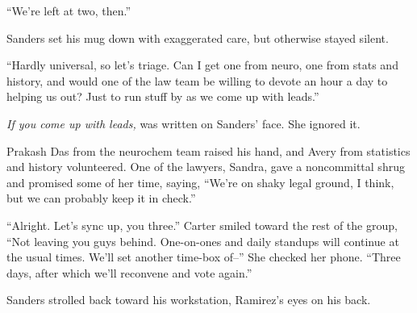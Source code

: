 ``We're left at two, then.''

Sanders set his mug down with exaggerated care, but otherwise stayed silent.

``Hardly universal, so let's triage. Can I get one from neuro, one from stats and history, and would one of the law team be willing to devote an hour a day to helping us out? Just to run stuff by as we come up with leads.''

\emph{If you come up with leads,} was written on Sanders' face. She ignored it.

Prakash Das from the neurochem team raised his hand, and Avery from statistics and history volunteered. One of the lawyers, Sandra, gave a noncommittal shrug and promised some of her time, saying, ``We're on shaky legal ground, I think, but we can probably keep it in check.''

``Alright. Let's sync up, you three.'' Carter smiled toward the rest of the group, ``Not leaving you guys behind. One-on-ones and daily standups will continue at the usual times. We'll set another time-box of--'' She checked her phone. ``Three days, after which we'll reconvene and vote again.''

Sanders strolled back toward his workstation, Ramirez's eyes on his back.
